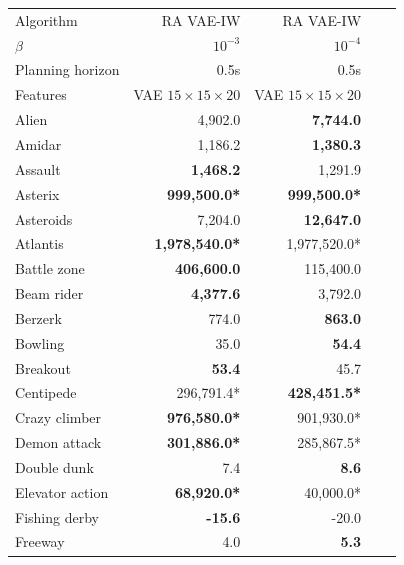 
\begin{table}[ht]
\begin{center}
\begin{small}
\begin{tabular}{lrrrl}

\toprule
Algorithm  & RA VAE-IW & RA VAE-IW \\
$\beta$ & $10^{-3}$ & $10^{-4}$\\
Planning horizon & 0.5s & 0.5s  \\
Features &  VAE $15 \times 15 \times 20$ &  VAE $15 \times 15 \times 20$ \\
\midrule

Alien           & 4,902.0              & \textbf{7,744.0}     \\
Amidar          & 1,186.2              & \textbf{1,380.3}     \\
Assault         & \textbf{1,468.2}     & 1,291.9              \\
Asterix         & \textbf{999,500.0*}   & \textbf{999,500.0*}   \\
Asteroids       & 7,204.0              & \textbf{12,647.0}    \\
Atlantis        & \textbf{1,978,540.0*} & 1,977,520.0*          \\
Battle zone     & \textbf{406,600.0}   & 115,400.0            \\
Beam rider      & \textbf{4,377.6}     & 3,792.0              \\
Berzerk         & 774.0                & \textbf{863.0}       \\
Bowling         & 35.0                 & \textbf{54.4}        \\
Breakout        & \textbf{53.4}        & 45.7                 \\
Centipede       & 296,791.4*           & \textbf{428,451.5*}   \\
Crazy climber   & \textbf{976,580.0*}   & 901,930.0*            \\
Demon attack    & \textbf{301,886.0*}   & 285,867.5*            \\
Double dunk     & 7.4                  & \textbf{8.6}         \\
Elevator action & \textbf{68,920.0*}    & 40,000.0*             \\
Fishing derby   & \textbf{-15.6}       & -20.0                \\
Freeway         & 4.0                  & \textbf{5.3}         \\

\end{tabular}
\end{small}
\end{center}
\end{table}

